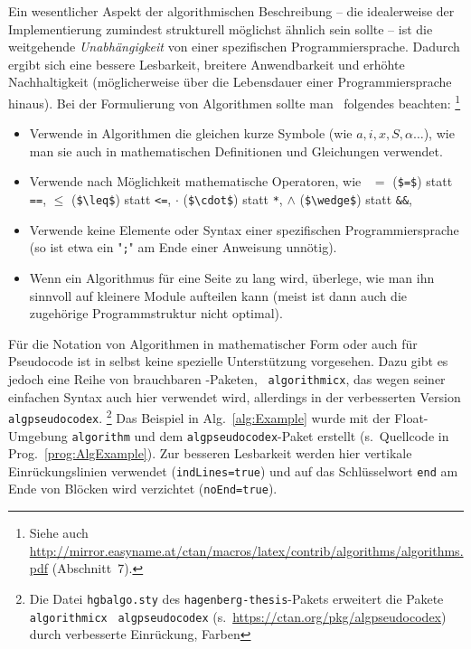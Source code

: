 Ein wesentlicher Aspekt der algorithmischen Beschreibung -- die idealerweise der Implementierung 
zumindest strukturell möglichst ähnlich sein sollte -- ist die weitgehende
\emph{Unabhängigkeit} von einer spezifischen Programmiersprache.
Dadurch ergibt sich eine bessere Lesbarkeit, breitere Anwendbarkeit und erhöhte Nachhaltigkeit
(möglicherweise über die Lebensdauer einer Programmiersprache hinaus).
Bei der Formulierung von Algorithmen sollte man \ua\ folgendes beachten:%
\footnote{Siehe auch \url{http://mirror.easyname.at/ctan/macros/latex/contrib/algorithms/algorithms.pdf}
(Abschnitt~7).}
\begin{itemize}
\item
Verwende in Algorithmen die gleichen kurze Symbole (wie $a, i, x, S, \alpha \ldots$), wie man sie auch in mathematischen Definitionen und Gleichungen verwendet.
\item
Verwende nach Möglichkeit mathematische Operatoren, wie \zB\
$=$	 (\verb!$=$!) statt \texttt{==},
$\leq$ (\verb!$\leq$!) statt \texttt{<=},
$\cdot$ (\verb!$\cdot$!) statt \texttt{*},
$\wedge$ (\verb!$\wedge$!) statt \texttt{\&\&},
\usw
\item
Verwende keine Elemente oder Syntax einer spezifischen Programmiersprache
(so ist etwa ein "\texttt{;}" am Ende einer Anweisung unnötig).
\item
Wenn ein Algorithmus für eine Seite zu lang wird, überlege, wie man ihn
sinnvoll auf kleinere Module aufteilen kann (meist ist dann auch die zugehörige
Programmstruktur nicht optimal).
\end{itemize}


Für die Notation von Algorithmen in mathematischer Form oder auch für
Pseudo\-code ist in \latex selbst keine spezielle Unterstützung vorgesehen.
Dazu gibt es jedoch eine Reihe von brauchbaren \latex-Paketen,
\ua\ \texttt{algorithmicx}, das wegen seiner einfachen Syntax auch hier
verwendet wird, allerdings in der verbesserten Version 
\texttt{algpseudocodex}.%
\footnote{Die Datei \nolinkurl{hgbalgo.sty} des \texttt{hagenberg-thesis}-Pakets erweitert die Pakete
\texttt{algorithmicx} \bzw\ \texttt{algpseudocodex} (s.\ \url{https://ctan.org/pkg/algpseudocodex})
durch verbesserte Einrückung, Farben \etc}
%
Das Beispiel in Alg.~\ref{alg:Example} wurde mit der Float-Umgebung \texttt{algorithm}
und dem \texttt{algpseudocodex}-Paket erstellt (s.\ Quellcode in Prog.\ \ref{prog:AlgExample}).
Zur besseren Lesbarkeit werden hier vertikale Einrückungslinien verwendet (\texttt{indLines=true}) und
auf das Schlüsselwort \texttt{end} am Ende von Blöcken wird verzichtet (\texttt{noEnd=true}).

